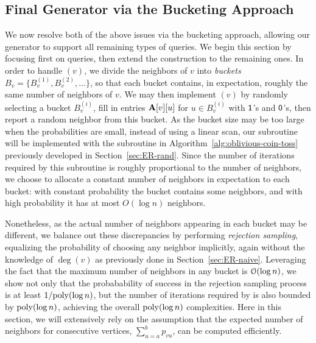 \subsection{Final Generator via the Bucketing Approach}
\label{sec:buckets}

We now resolve both of the above issues via the bucketing approach, allowing our generator to support all remaining types of queries.
We begin this section by focusing first on  queries, then extend the construction to the remaining ones. In order to handle $(v)$,
we divide the neighbors of $v$ into \emph{buckets} $B_v = \{ B_v^{(1)}, B_v^{(2)},\ldots\}$,
so that each bucket contains, in expectation, roughly the same number of neighbors of $v$.
We may then implement $(v)$ by randomly selecting a bucket $B_v^{(i)}$,
fill in entries $\mathbf{A}[v][u]$ for $u \in B_v^{(i)}$ with $\mathsf{1}$'s and $\mathsf{0}$'s, then report a random neighbor from this bucket.
As the bucket size may be too large when the probabilities are small, instead of using a linear scan, our  subroutine will be implemented with the  subroutine in Algorithm~\ref{alg:oblivious-coin-toss} previously developed in Section~\ref{sec:ER-rand}.
Since the number of iterations required by this subroutine is roughly proportional to the number of neighbors, we choose to allocate a constant number of neighbors in expectation to each bucket: with constant probability the bucket contains some neighbors, and with high probability it has at most $O(\log n)$ neighbors.

Nonetheless, as the actual number of neighbors appearing in each bucket may be different, we balance out these discrepancies by performing \emph{rejection sampling}, equalizing the probability of choosing any neighbor implicitly, again without the knowledge of $\deg(v)$ as previously done in Section~\ref{sec:ER-naive}.
Leveraging the fact that the maximum number of neighbors in any bucket is $\Bo(\log n)$, we show not only that the probabability of success in the rejection sampling process is at least $1/\mathrm{poly}(\log n)$, but the number of iterations required by  is also bounded by $\mathrm{poly}(\log n)$, achieving the overall $\mathrm{poly}(\log n)$ complexities.
Here in this section, we will extensively rely on the assumption that the expected number of neighbors for consecutive vertices, $\sum_{u=a}^b p_{vu}$, can be computed efficiently.

